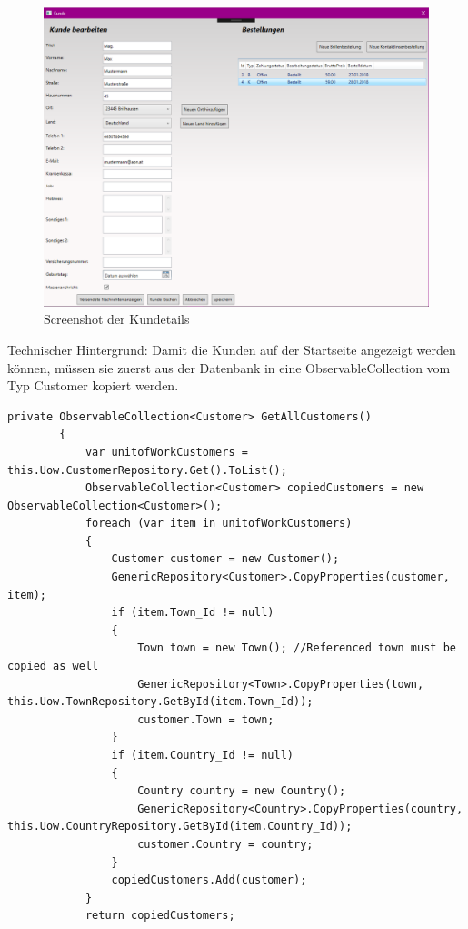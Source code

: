 \begin{figure}[H]
\begin{center}
	\includegraphics[scale=.25]{images/KundenDetails.png}
\end{center}
	\caption{Screenshot der Kundetails}
	\label{fig:sample}
\end{figure}
Technischer Hintergrund:
Damit die Kunden auf der Startseite angezeigt werden können, müssen sie zuerst aus der Datenbank in eine ObservableCollection vom Typ Customer kopiert werden. 
\begin{lstlisting}
private ObservableCollection<Customer> GetAllCustomers()
        {
            var unitofWorkCustomers = this.Uow.CustomerRepository.Get().ToList();
            ObservableCollection<Customer> copiedCustomers = new ObservableCollection<Customer>();
            foreach (var item in unitofWorkCustomers)
            {
                Customer customer = new Customer();
                GenericRepository<Customer>.CopyProperties(customer, item);
                if (item.Town_Id != null)
                {
                    Town town = new Town(); //Referenced town must be copied as well
                    GenericRepository<Town>.CopyProperties(town, this.Uow.TownRepository.GetById(item.Town_Id));
                    customer.Town = town;
                }
                if (item.Country_Id != null)
                {
                    Country country = new Country();
                    GenericRepository<Country>.CopyProperties(country, this.Uow.CountryRepository.GetById(item.Country_Id));
                    customer.Country = country;
                }
                copiedCustomers.Add(customer);
            }
            return copiedCustomers;
\end{lstlisting}
